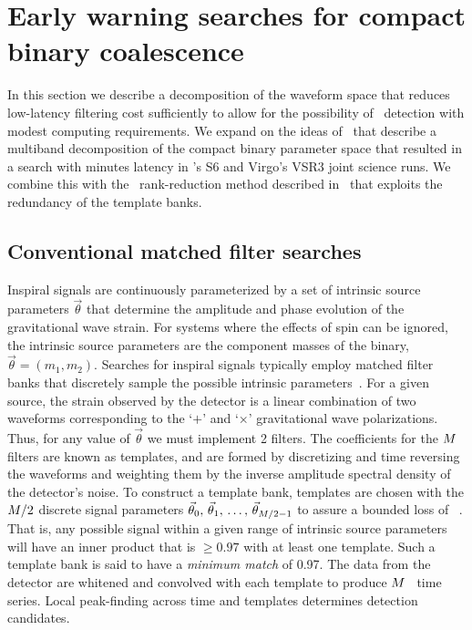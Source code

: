 \section{Early warning searches for compact binary coalescence}
\label{SECII}\label{sec:method}

In this section we describe a decomposition of the \CBC{} waveform
space that reduces low-latency filtering cost sufficiently to allow for the
possibility of \earlywarning\ detection with modest computing requirements.  We
expand on the ideas of~\cite{Marion2004, Buskulic2010} that describe a
multiband decomposition of the compact binary parameter space that resulted in
a search with minutes latency in \LIGO{}'s S6 and Virgo's VSR3 joint science
runs.  We combine this with the \SVD\ rank-reduction method described
in~\cite{Cannon:2010p10398} that exploits the redundancy of the template banks.

\subsection{Conventional \CBC{} matched filter searches}

Inspiral signals are continuously parameterized by a set of intrinsic source
parameters $\vec\theta$ that determine the amplitude and phase evolution of the
gravitational wave strain. For systems where the effects of spin can be
ignored, the intrinsic source parameters are the component masses of the
binary, $\vec\theta = (m_1, m_2)$. Searches for inspiral signals typically
employ matched filter banks that discretely sample the possible intrinsic
parameters~\cite{findchirppaper}.  For a given source, the strain observed by
the detector is a linear combination of two waveforms corresponding to the
`$+$' and `$\times$' gravitational wave polarizations.  Thus, for any value of
$\vec\theta$ we must implement 2 filters.  The coefficients for the $M$ filters
are known as templates, and are formed by discretizing and time reversing the
waveforms and weighting them by the inverse amplitude spectral density of the
detector's noise. To construct a template bank, templates are chosen with the
$M/2$ discrete signal parameters $\vec\theta_0,\, \vec\theta_1,\, \dots,\,
\vec\theta_{M/2-1}$ to assure a bounded loss of \SNR~\cite{Owen:1998dk}. That
is, any possible signal within a given range of intrinsic
source parameters will have an inner product that is $\geqslant 0.97$ with at
least one template. Such a template bank is said to have a {\em minimum match}
of 0.97. The data from the detector are whitened and convolved with each
template to produce $M$ \SNR\ time series. Local peak-finding across time and
templates determines detection candidates.

